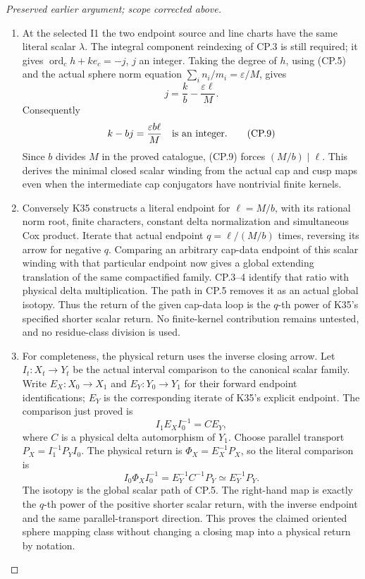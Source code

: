 \begin{proof}[Preserved earlier argument; scope corrected above]
\begin{enumerate}[label=\arabic*.]
\item At the selected I1 the two endpoint source and line charts have the
same literal scalar \(\lambda\). The integral component reindexing of
CP.3 is still required; it gives
\(\operatorname{ord}_c h+ke_c=-j\), \(j\) an integer. Taking the degree
of \(h\), using (CP.5) and the actual sphere norm equation
\(\sum_i n_i/m_i=\varepsilon/M\), gives
\[
                 j=\frac{k}{b}-\frac{\varepsilon\ell}{M}.
                                                               \tag{CP.8}
\]
Consequently
\[
                  k-bj=\frac{\varepsilon b\ell}{M}
                          \quad\hbox{is an integer}.           \tag{CP.9}
\]
Since \(b\) divides \(M\) in the proved catalogue, (CP.9) forces
\((M/b)\mid\ell\). This derives the minimal closed scalar winding
from the actual cap and cusp maps even when the intermediate cap
conjugators have nontrivial finite kernels.

\item Conversely K35 constructs a literal endpoint for \(\ell=M/b\),
with its rational norm root, finite characters, constant delta
normalization and simultaneous Cox product. Iterate that actual
endpoint \(q=\ell/(M/b)\) times, reversing its arrow for negative
\(q\). Comparing an arbitrary cap-data endpoint of this scalar winding
with that particular endpoint now gives a global extending
translation of the same compactified family. CP.3--4 identify that
ratio with physical delta multiplication. The path in CP.5 removes
it as an actual global isotopy. Thus the return of the given
cap-data loop is the \(q\)-th power of K35's specified shorter scalar
return. No finite-kernel contribution remains untested, and no
residue-class division is used.

\item For completeness, the physical return uses the inverse closing
arrow. Let \(I_t:X_t\to Y_t\) be the actual interval comparison to
the canonical scalar family. Write \(E_X:X_0\to X_1\) and
\(E_Y:Y_0\to Y_1\) for their forward endpoint identifications;
\(E_Y\) is the corresponding iterate of K35's explicit endpoint.
The comparison just proved is
\[
             I_1E_XI_0^{-1}=C E_Y,                         \tag{CP.10}
\]
where \(C\) is a physical delta automorphism of \(Y_1\). Choose
parallel transport \(P_X=I_1^{-1}P_YI_0\). The physical return
is \(\Phi_X=E_X^{-1}P_X\), so the literal comparison is
\[
 I_0\Phi_XI_0^{-1}=E_Y^{-1}C^{-1}P_Y
                    \simeq E_Y^{-1}P_Y.                  \tag{CP.11}
\]
The isotopy is the global scalar path of CP.5. The right-hand map
is exactly the \(q\)-th power of the positive shorter scalar
return, with the inverse endpoint and the same parallel-transport
direction. This proves the claimed oriented sphere mapping class
without changing a closing map into a physical return by notation.


\end{enumerate}
\end{proof}
